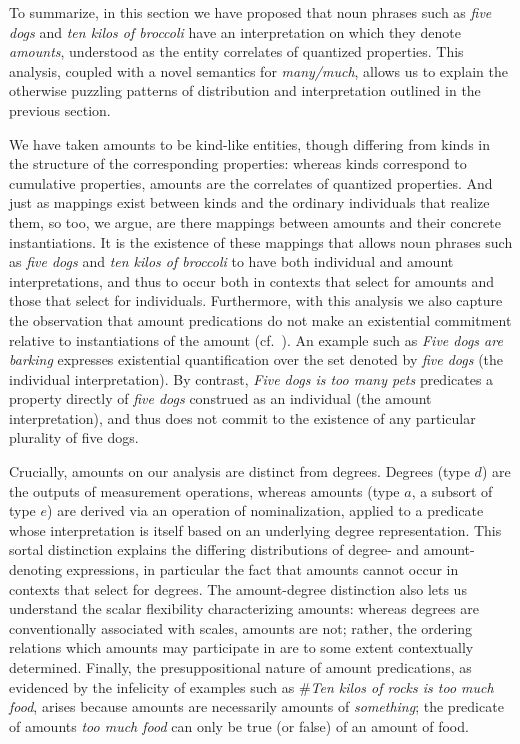 \documentclass[a4paper,12pt,twoside]{article}
\begin{document}
	To summarize, in this section we have proposed that noun phrases such as \textit{five dogs} and \textit{ten kilos of broccoli} have an interpretation on which they denote \textit{amounts},  understood as the entity correlates of quantized properties. This analysis, coupled with a novel semantics for \textit{many/much}, allows us to explain the otherwise puzzling patterns of distribution and interpretation outlined in the previous section.
	
	We have taken amounts to be  kind-like entities, though differing from kinds in the structure of the corresponding properties: whereas kinds correspond to cumulative properties, amounts are the correlates of  quantized properties. And just as mappings exist between kinds and the ordinary individuals that realize them, so too, we argue, are there mappings between amounts and their concrete instantiations. It is the existence of these mappings that allows noun phrases such as \textit{five dogs}  and \textit{ten kilos of broccoli} to have both individual and amount interpretations, and thus to occur both in contexts that select for amounts and those that select for individuals. Furthermore, with this analysis we also capture the observation that amount predications do not make an existential commitment relative to instantiations of the amount (cf.\ \citealt{Rett:2014}). An example such as \textit{Five dogs are barking} expresses existential quantification over the set denoted by \textit{five dogs} (the individual interpretation). By contrast,  \textit{Five dogs is too many pets} predicates a property  directly of \textit{five dogs} construed as an individual (the amount interpretation), and thus does not commit to the existence of any particular plurality of five dogs.
	
	Crucially, amounts on our analysis are distinct from degrees. Degrees (type $d$) are the outputs of measurement operations, whereas amounts (type $a$, a subsort of type $e$) are derived via an operation of nominalization, applied to a predicate whose interpretation is itself based on an underlying degree representation. This sortal distinction explains the differing distributions of degree- and amount-denoting expressions, in particular the fact that amounts cannot occur in contexts that select for degrees. The amount-degree distinction also lets us understand the scalar flexibility characterizing amounts: whereas degrees are conventionally associated with scales, amounts are not; rather, the ordering relations which amounts may participate in are to some extent contextually determined. Finally, the presuppositional nature of amount predications, as evidenced by the infelicity of  examples such as \#\textit{Ten kilos of rocks is too much food}, arises because amounts are necessarily amounts of \textit{something}; the predicate of amounts \textit{too much food} can only be true (or false) of an amount of food.
	
\end{document}
